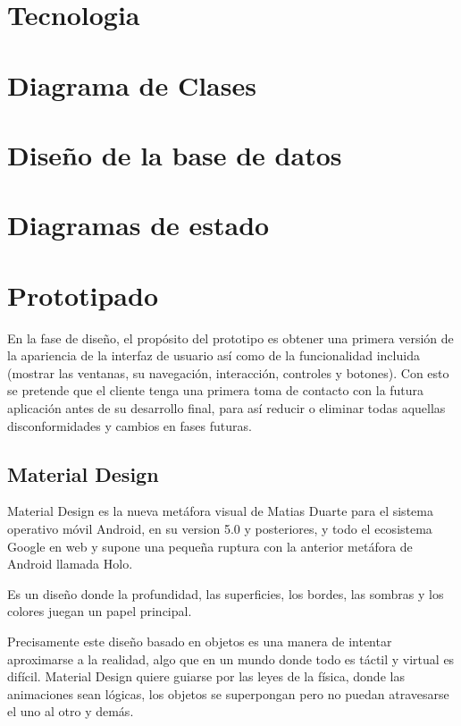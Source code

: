 \documentclass[../pfc.tex]{subfiles}
\begin{document}
	
	
	\section{Tecnologia}
	
	\section{Diagrama de Clases}
	
	\section{Diseño de la base de datos}
	
	\section{Diagramas de estado}
	
	\section{Prototipado}
	
	En la fase de diseño, el propósito del prototipo es obtener una primera versión de la apariencia de la interfaz de usuario así como de la funcionalidad incluida (mostrar las ventanas, su navegación, interacción, controles y botones). Con esto se pretende que el cliente tenga una primera toma de contacto con la futura aplicación antes de su desarrollo final, para así reducir o eliminar todas aquellas disconformidades y cambios en fases futuras.
	
		\subsection{Material Design}
		Material Design es la nueva metáfora visual de Matias Duarte para el sistema operativo móvil Android, en su version 5.0 y posteriores, y todo el ecosistema Google en web y supone una pequeña ruptura con la anterior metáfora de Android llamada Holo. 
		
		Es un diseño donde la profundidad, las superficies, los bordes, las sombras y los colores juegan un papel principal.
		
		Precisamente este diseño basado en objetos es una manera de intentar aproximarse a la realidad, algo que en un mundo donde todo es táctil y virtual es difícil. Material Design quiere guiarse por las leyes de la física, donde las animaciones sean lógicas, los objetos se superpongan pero no puedan atravesarse el uno al otro y demás.
		
\end{document}
